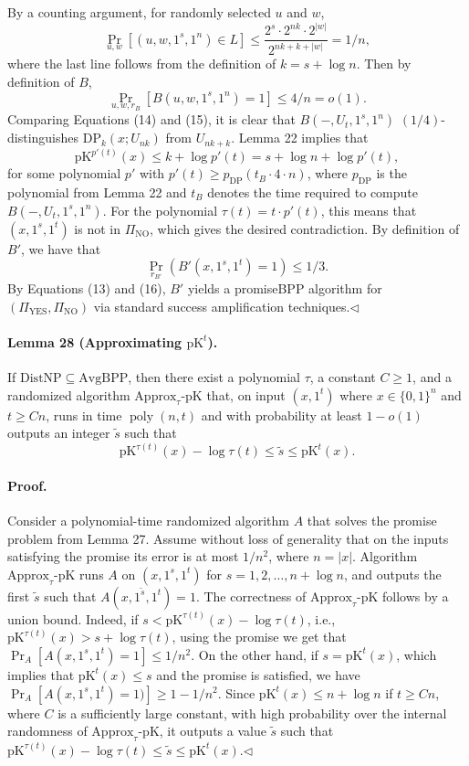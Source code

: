 By a counting argument, for randomly selected $u$ and $w$,
\[\Pr_{u,w}[(u,w,1^s,1^n)\in L]\leq\frac{2^s\cdot2^{nk}\cdot2^{|w|}}{2^{nk+k+|w|}}=1/n,\]
where the last line follows from the definition of $k=s+\log n$. Then by definition of $B$,
\[\Pr_{u,w,r_B}[B(u,w,1^s,1^n)=1]\leq4/n=o(1).\tag{15}\]
Comparing Equations (14) and (15), it is clear that $B(-,U_t,1^s,1^n)$ $(1/4)$-distinguishes $\mathrm{DP}_k(x;U_{nk})$ from $U_{nk+k}$. Lemma 22 implies that
\[\mathrm{pK}^{p'(t)}(x)\leq k+\log p'(t)=s+\log n+\log p'(t),\]
for some polynomial $p'$ with $p'(t)\geq p_{\mathrm{DP}}(t_B\cdot4\cdot n)$, where $p_{\mathrm{DP}}$ is the polynomial from Lemma 22 and $t_B$ denotes the time required to compute $B(-,U_t,1^s,1^n)$. For the polynomial $\tau(t)=t\cdot p'(t)$, this means that $(x,1^s,1^t)$ is not in $\Pi_{\mathrm{NO}}$, which gives the desired contradiction. By definition of $B'$, we have that
\[\Pr_{r_{B'}}(B'(x,1^s,1^t)=1)\leq1/3.\tag{16}\]
By Equations (13) and (16), $B'$ yields a promiseBPP algorithm for $(\Pi_{\mathrm{YES}},\Pi_{\mathrm{NO}})$ via standard success amplification techniques.\hfill$\triangleleft$
\paragraph{Lemma 28 (Approximating $\mathrm{pK}^t$).} If $\mathrm{DistNP}\subseteq\mathrm{AvgBPP}$, then there exist a polynomial $\tau$, a constant $C\geq1$, and a randomized algorithm $\mathrm{Approx}_{\tau}\text{-}\mathrm{pK}$ that, on input $(x,1^t)$ where $x\in\{0,1\}^n$ and $t\geq Cn$, runs in time $\operatorname{poly}(n,t)$ and with probability at least $1-o(1)$ outputs an integer $\widetilde s$ such that
\[\mathrm{pK}^{\tau(t)}(x)-\log\tau(t)\leq\widetilde s\leq\mathrm{pK}^t(x).\]
\paragraph{Proof.} Consider a polynomial-time randomized algorithm $A$ that solves the promise problem from Lemma 27. Assume without loss of generality that on the inputs satisfying the promise its error is at most $1/n^2$, where $n=|x|$. Algorithm $\mathrm{Approx}_\tau\text{-}\mathrm{pK}$ runs $A$ on $(x,1^s,1^t)$ for $s=1,2,\ldots,n+\log n$, and outputs the first $\widetilde s$ such that $A(x,1^{\widetilde s},1^t)=1$.
The correctness of $\mathrm{Approx}_\tau\text{-}\mathrm{pK}$ follows by a union bound. Indeed, if $s<\mathrm{pK}^{\tau(t)}(x)-\log\tau(t)$, i.e., $\mathrm{pK}^{\tau(t)}(x)>s+\log\tau(t)$, using the promise we get that $\Pr_A[A(x,1^s,1^t)=1]\leq1/n^2$. On the other hand, if $s=\mathrm{pK}^t(x)$, which implies that $\mathrm{pK}^t(x)\leq s$ and the promise is satisfied, we have $\Pr_A[A(x,1^s,1^t)=1)]\geq1-1/n^2$. Since $\mathrm{pK}^t(x)\leq n+\log n$ if $t\geq Cn$, where $C$ is a sufficiently large constant, with high probability over the internal randomness of $\mathrm{Approx}_\tau\text{-}\mathrm{pK}$, it outputs a value $\widetilde s$ such that $\mathrm{pK}^{\tau(t)}(x)-\log\tau(t)\leq\widetilde s\leq\mathrm{pK}^t(x)$.\hfill$\triangleleft$
